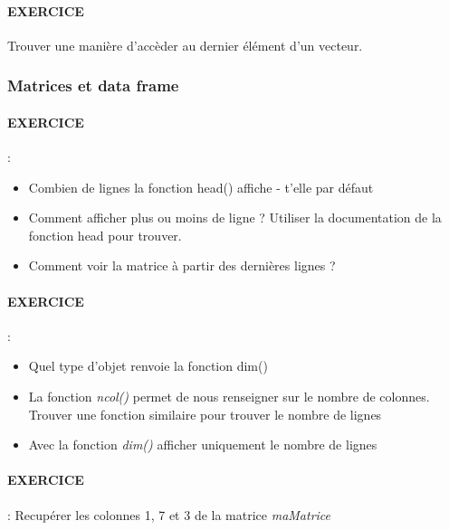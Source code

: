 

\paragraph{EXERCICE} Trouver une manière d'accèder au dernier élément d'un vecteur.



\subsubsection{Matrices et data frame}


\paragraph{EXERCICE} : 
\begin{itemize}
\item Combien de lignes la fonction head() affiche - t'elle par défaut
\item Comment afficher plus ou moins de ligne ? Utiliser la documentation de la fonction head pour trouver.
\item Comment voir la matrice à partir des dernières lignes ?
\end{itemize}

\paragraph{EXERCICE} :
\begin{itemize}
\item Quel type d'objet renvoie la fonction dim()
\item La fonction \emph{ncol()} permet de nous renseigner sur le nombre de colonnes.
Trouver une fonction similaire pour trouver le nombre de lignes
\item Avec la fonction \emph{dim()} afficher uniquement le nombre de lignes
\end{itemize}

\paragraph{EXERCICE} : Recupérer les colonnes 1, 7 et 3 de la matrice \emph{maMatrice}

